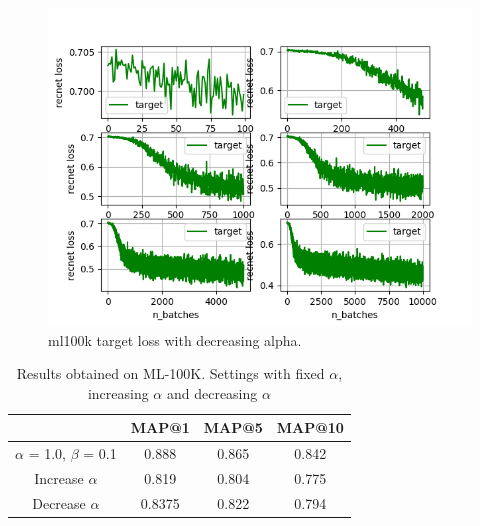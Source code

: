 \documentclass{article}
\begin{document}
\begin{figure}[t!]
\begin{center}
\includegraphics[width=1\textwidth]{figures/ml100k/target_loss_dec_alpha}  
\end{center}
\caption{ml100k target loss with decreasing alpha.}
\label{fig:ProperCover}
\end{figure}

\begin{table}[]
\centering
\caption{Results obtained on ML-100K. Settings with fixed $\alpha$, increasing $\alpha$ and decreasing $\alpha$}
\label{my-label}
\begin{tabular}{|c|c|c|c|}
\hline
                              & MAP@1 & MAP@5 & MAP@10 \\ \hline
$\alpha$ = 1.0, $\beta$ = 0.1 & 0.888 & 0.865 & 0.842  \\ \hline
Increase $\alpha$             &   0.819    &0.804       &   0.775     \\ \hline
Decrease $\alpha$             &   0.8375    &0.822       & 0.794       \\ \hline
\end{tabular}
\end{table}
\end{document}
